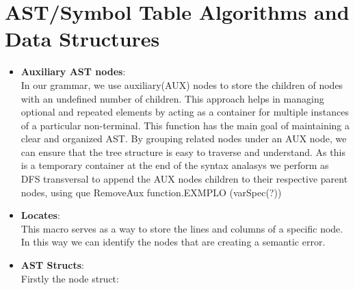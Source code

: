 \documentclass[12pt]{article}
\begin{document}
\section{AST/Symbol Table Algorithms and Data Structures}
    \begin{itemize}
        \item \textbf{Auxiliary AST nodes}: \\In our grammar, we use auxiliary(AUX) nodes to store the children of nodes with an undefined number of children. This approach helps in managing optional and repeated elements by acting as a container for multiple instances of a particular non-terminal. This function has the main goal of maintaining a clear and organized AST. By grouping related nodes under an AUX node, we can ensure that the tree structure is easy to traverse and understand. As this is a temporary container at the end of the syntax analasys we perform as DFS transversal to append the AUX nodes children to their respective parent nodes, using que RemoveAux function.EXMPLO (varSpec(?))
    \begin{center}
    \end{center}
        
    
    \item \textbf{Locates}: \\ This macro serves as a way to store the lines and columns of a specific node. In this way we can identify the nodes that are creating a semantic error.
    \item \textbf{AST Structs}: \\ Firstly the node struct:


\end{itemize}
\end{document}
